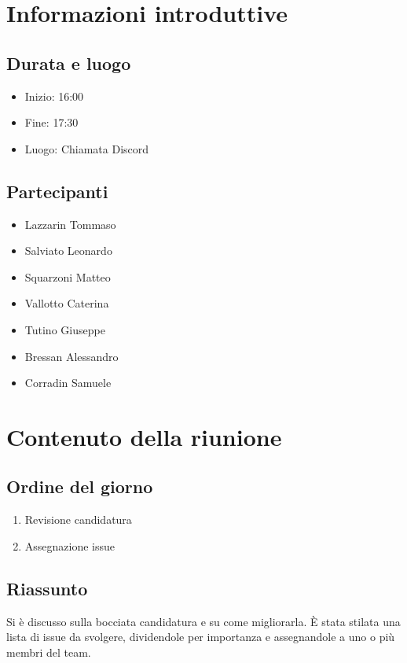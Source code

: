 \documentclass[10pt]{article}
\begin{document}
\vspace{1pt}
\tableofcontents{\newpage}

\section{Informazioni introduttive}
\subsection{Durata e luogo}
\begin{itemize}
  \item Inizio: 16:00
  \item Fine: 17:30
  \item Luogo: Chiamata Discord
\end{itemize}
\subsection{Partecipanti}
\begin{itemize}
  \item Lazzarin Tommaso
  \item Salviato Leonardo
  \item Squarzoni Matteo
  \item Vallotto Caterina
  \item Tutino Giuseppe
  \item Bressan Alessandro
  \item Corradin Samuele
\end{itemize}

\section{Contenuto della riunione}
\subsection{Ordine del giorno}
\begin{enumerate}
  \item Revisione candidatura
  \item Assegnazione issue
\end{enumerate}

\subsection{Riassunto}
Si è discusso sulla bocciata candidatura e su come migliorarla.
È stata stilata una lista di issue da svolgere, dividendole per importanza e assegnandole a uno o più membri del team.
\end{document}
